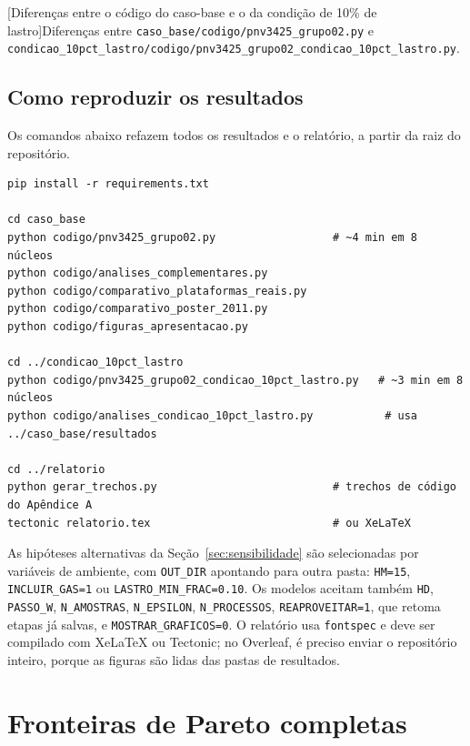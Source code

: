 \documentclass[11pt,a4paper]{article}
\begin{document}
\par{}\medskip
{}[Diferenças entre o código do caso-base e o da condição de 10\% de lastro]{Diferenças
entre \texttt{caso\_base/codigo/pnv3425\_grupo02.py} e
\texttt{condicao\_10pct\_lastro/codigo/pnv3425\_grupo02\_condicao\_10pct\_lastro.py}.}\label{lst:diff}

\subsection{Como reproduzir os resultados}

Os comandos abaixo refazem todos os resultados e o relatório, a partir da raiz do repositório.

\begin{Verbatim}[numbers=none]
pip install -r requirements.txt

cd caso_base
python codigo/pnv3425_grupo02.py                  # ~4 min em 8 núcleos
python codigo/analises_complementares.py
python codigo/comparativo_plataformas_reais.py
python codigo/comparativo_poster_2011.py
python codigo/figuras_apresentacao.py

cd ../condicao_10pct_lastro
python codigo/pnv3425_grupo02_condicao_10pct_lastro.py   # ~3 min em 8 núcleos
python codigo/analises_condicao_10pct_lastro.py           # usa ../caso_base/resultados

cd ../relatorio
python gerar_trechos.py                           # trechos de código do Apêndice A
tectonic relatorio.tex                            # ou XeLaTeX
\end{Verbatim}

As hipóteses alternativas da Seção~\ref{sec:sensibilidade} são selecionadas por variáveis de
ambiente, com \texttt{OUT\_DIR} apontando para outra pasta: \texttt{HM=15}, \texttt{INCLUIR\_GAS=1}
ou \texttt{LASTRO\_MIN\_FRAC=0.10}. Os modelos aceitam também \texttt{HD}, \texttt{PASSO\_W},
\texttt{N\_AMOSTRAS}, \texttt{N\_EPSILON}, \texttt{N\_PROCESSOS}, \texttt{REAPROVEITAR=1}, que
retoma etapas já salvas, e \texttt{MOSTRAR\_GRAFICOS=0}. O relatório usa \texttt{fontspec} e deve
ser compilado com XeLaTeX ou Tectonic; no Overleaf, é preciso enviar o repositório inteiro, porque
as figuras são lidas das pastas de resultados.

\section{Fronteiras de Pareto completas}
\end{document}
